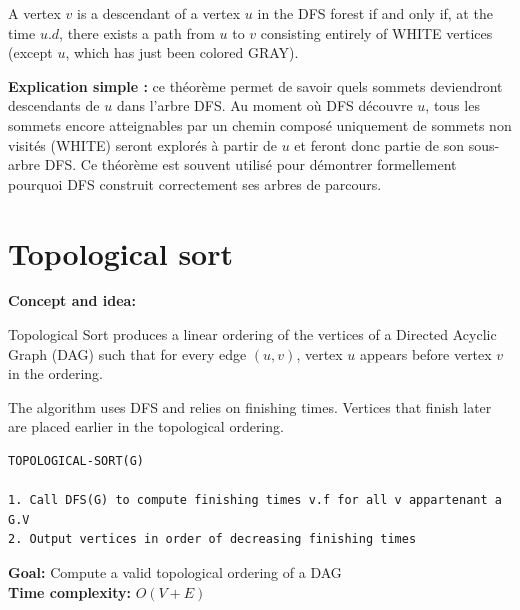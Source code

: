 \documentclass[11pt,a4paper,openany]{book}
\begin{document}
\begin{defnbox}[title=White-Path Theorem]
A vertex $v$ is a descendant of a vertex $u$ in the DFS forest if and only if, at the time $u.d$, there exists a path from $u$ to $v$ consisting entirely of WHITE vertices (except $u$, which has just been colored GRAY).

\medskip

\textbf{Explication simple :} ce théorème permet de savoir quels sommets deviendront descendants de $u$ dans l'arbre DFS. Au moment où DFS découvre $u$, tous les sommets encore atteignables par un chemin composé uniquement de sommets non visités (WHITE) seront explorés à partir de $u$ et feront donc partie de son sous-arbre DFS. Ce théorème est souvent utilisé pour démontrer formellement pourquoi DFS construit correctement ses arbres de parcours.
\end{defnbox}




\vspace{2cm}














\section{Topological sort}


\textbf{Concept and idea:}

Topological Sort produces a linear ordering of the vertices of a Directed Acyclic Graph (DAG) such that for every edge $(u,v)$, vertex $u$ appears before vertex $v$ in the ordering.

The algorithm uses DFS and relies on finishing times. Vertices that finish later are placed earlier in the topological ordering.

\begin{lstlisting}
TOPOLOGICAL-SORT(G)

1. Call DFS(G) to compute finishing times v.f for all v appartenant a G.V
2. Output vertices in order of decreasing finishing times
\end{lstlisting}


\textbf{Goal:} Compute a valid topological ordering of a DAG \\

\textbf{Time complexity:} $O(V + E)$ \\
\end{document}
